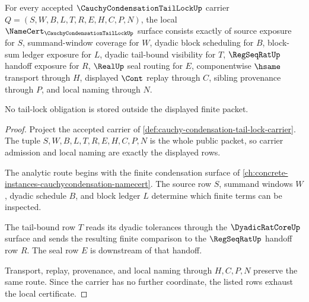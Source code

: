 \begin{theorem}
\label{thm:cauchy-condensation-tail-lock-namecert-obligations}
For every accepted $\CauchyCondensationTailLockUp$ carrier $Q=(S,W,B,L,T,R,E,H,C,P,N)$, the local $\NameCert_{\CauchyCondensationTailLockUp}$ surface consists exactly of source exposure for $S$, summand-window coverage for $W$, dyadic block scheduling for $B$, block-sum ledger exposure for $L$, dyadic tail-bound visibility for $T$, $\RegSeqRatUp$ handoff exposure for $R$, $\RealUp$ seal routing for $E$, componentwise $\hsame$ transport through $H$, displayed $\Cont$ replay through $C$, sibling provenance through $P$, and local naming through $N$.

No tail-lock obligation is stored outside the displayed finite packet.
\end{theorem}
\begin{proof}
Project the accepted carrier of \autoref{def:cauchy-condensation-tail-lock-carrier}. The tuple $S,W,B,L,T,R,E,H,C,P,N$ is the whole public packet, so carrier admission and local naming are exactly the displayed rows.

The analytic route begins with the finite condensation surface of \autoref{ch:concrete-instances-cauchycondensation-namecert}. The source row $S$, summand windows $W$, dyadic schedule $B$, and block ledger $L$ determine which finite terms can be inspected.

The tail-bound row $T$ reads its dyadic tolerances through the $\DyadicRatCoreUp$ surface and sends the resulting finite comparison to the $\RegSeqRatUp$ handoff row $R$. The seal row $E$ is downstream of that handoff.

Transport, replay, provenance, and local naming through $H,C,P,N$ preserve the same route. Since the carrier has no further coordinate, the listed rows exhaust the local certificate.
\end{proof}

